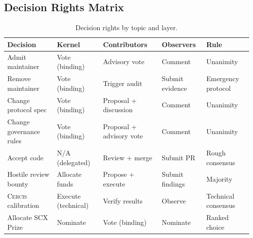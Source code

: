 \documentclass[12pt,a4paper]{article}
\theoremstyle{definition}
\newcommand{\Cercis}{\textsc{Cercis}}
\begin{document}
\subsection{Decision Rights Matrix}
\begin{table}[htbp]
\centering
\caption{Decision rights by topic and layer.}
\label{tab:decision_rights}
\begin{tabular}{p{3cm}p{2.5cm}p{2.8cm}p{2.8cm}p{2.5cm}}
\toprule
\textbf{Decision} & \textbf{Kernel} & \textbf{Contributors} & \textbf{Observers} & \textbf{Rule} \\
\midrule
Admit maintainer & Vote (binding) & Advisory vote & Comment & Unanimity \\
Remove maintainer & Vote (binding) & Trigger audit & Submit evidence & Emergency protocol \\
Change protocol spec & Vote (binding) & Proposal + discussion & Comment & Unanimity \\
Change governance rules & Vote (binding) & Proposal + advisory vote & Comment & Unanimity \\
Accept code & N/A (delegated) & Review + merge & Submit PR & Rough consensus \\
Hostile review bounty & Allocate funds & Propose + execute & Submit findings & Majority \\
\Cercis{} calibration & Execute (technical) & Verify results & Observe & Technical consensus \\
Allocate SCX Prize & Nominate & Vote (binding) & Nominate & Ranked choice \\
\bottomrule
\end{tabular}
\end{table}
\end{document}
